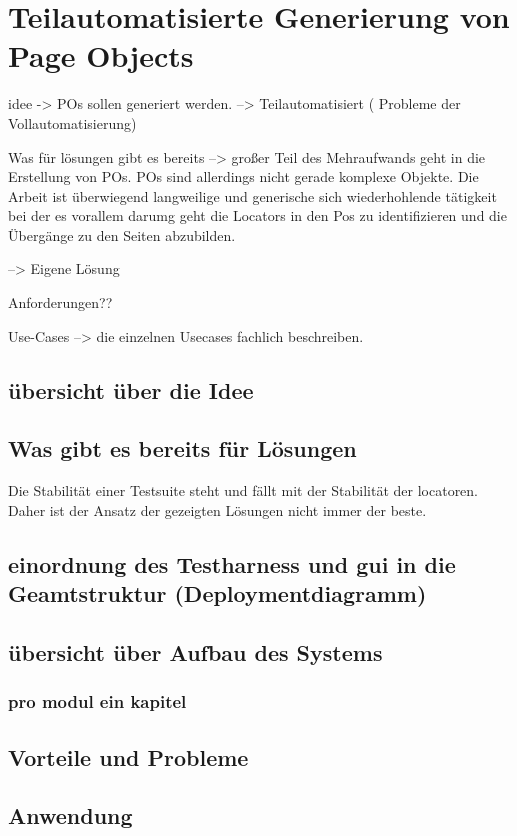 \chapter{Teilautomatisierte Generierung von Page Objects}
\label{sec:teilautomatisierte_generierung_von_pageObjects}

idee -> POs sollen generiert werden.
--> Teilautomatisiert ( Probleme der Vollautomatisierung)

Was für lösungen gibt es bereits
--> großer Teil des Mehraufwands geht in die Erstellung von POs. POs sind allerdings nicht gerade komplexe Objekte. Die Arbeit ist überwiegend langweilige und generische sich wiederhohlende tätigkeit bei der es vorallem darumg geht die Locators in den Pos zu identifizieren und die Übergänge zu den Seiten abzubilden.

--> Eigene Lösung

Anforderungen??

Use-Cases
--> die einzelnen Usecases fachlich beschreiben.

\section{übersicht über die Idee}


\section{Was gibt es bereits für Lösungen}
Die Stabilität einer Testsuite steht und fällt mit der Stabilität der locatoren. Daher ist der Ansatz der gezeigten Lösungen nicht immer der beste.


\section{einordnung des Testharness und gui in die Geamtstruktur (Deploymentdiagramm)}

\section{übersicht über Aufbau des Systems}

\subsection{pro modul ein kapitel}

\section{Vorteile und Probleme}

\section{Anwendung}
